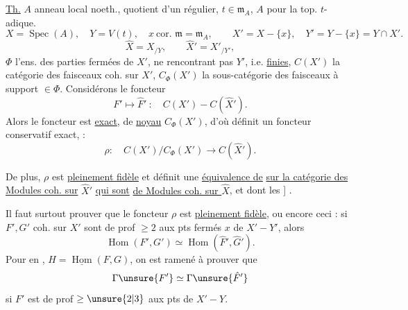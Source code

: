 
\uline{Th.} $A$ anneau local noeth., quotient d'un régulier,
$t\in\mathfrak m_A$, $A$  pour la top. $t$-adique.
\[
X=\operatorname{Spec}(A),\quad Y=V(t),\quad x\ \text{cor. }\mathfrak m=\mathfrak m_A,
\qquad X'=X-\{x\},\quad Y'=Y-\{x\}=Y\cap X'.
\]
\[
\hat X=X_{/Y},\qquad \hat X'=X'_{/Y'},
\]
$\Phi$ l'ens. des parties fermées de $X'$,
ne rencontrant pas $Y'$, i.e. \uline{finies},
$C(X')$ la catégorie des faisceaux coh. sur $X'$,
$C_\Phi(X')$ la sous-catégorie des faisceaux à support $\in\Phi$.
Considérons le foncteur 
\[
F'\longmapsto\hat F'\ :\quad C(X')\mathbin{-}C(\hat X').
\]
Alors le foncteur est \uline{exact}, de \uline{noyau} $C_\Phi(X')$,
d'où définit un foncteur conservatif exact, : 
\[
\rho:\quad C(X')/C_\Phi(X')\longrightarrow C(\hat X').
\]
\unsure{]}

De plus, $\rho$ est \uline{pleinement fidèle}
 et
définit une \uline{équivalence de}
\uline{sur la catégorie des Modules coh. sur} $\hat X'$
\uline{qui sont} 
\uline{de Modules coh. sur $\hat X$}, et
dont les 
]
.



Il faut surtout prouver que le foncteur
$\rho$ est \uline{pleinement fidèle}, ou encore ceci : si
$F',G'$  coh. sur $X'$ sont de prof $\ge2$ aux
pts 
fermés $x$ de $X'-Y'$,  alors
\[
\operatorname{Hom}(F',G')\simeq\operatorname{Hom}(\hat F',\hat G').
\]
Pour en , 
$H=\underline{\operatorname{Hom}}(F,G)$,
on est ramené à prouver que
\[
\Gamma\unsure{F'}\simeq\Gamma\unsure{\hat F'}
\]
si $F'$ est de prof $\ge\unsure{2|3}$ aux pts
 de $X'-Y$.

